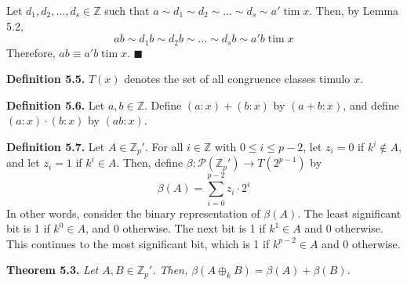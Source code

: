 \documentclass{article}
\newcommand{\tim}{\;\text{tim}\;}
\newcommand{\zee}{\mathbb{Z}}
\begin{document}
Let $d_1, d_2, \ldots, d_s \in \zee$
such that $a \sim d_1 \sim d_2 \sim \ldots \sim d_s \sim a' \tim x$.
Then, by Lemma 5.2,
\[ab \sim d_1b \sim d_2b \sim \ldots
\sim d_sb \sim a'b \tim x\]
Therefore, $ab \equiv a'b \tim x$.
$\blacksquare$

\textbf{Definition 5.5.} $T(x)$ denotes the set of all
congruence classes timulo $x$.

\textbf{Definition 5.6.} Let $a, b \in \zee$. Define
$(a:x) + (b:x)$ by $(a+b:x)$, and define $(a:x) \cdot (b:x)$
by $(ab:x)$.

\textbf{Definition 5.7.} Let $A \in \zee_p'$. For all $i \in \zee$
with $0 \leq i \leq p - 2$, let $z_i = 0$ if $k^i \not\in A$,
and let $z_i = 1$ if $k^i \in A$. Then, define
$\beta: \mathcal{P}(\zee_p') \rightarrow T(2^{p-1})$ by
\[\beta(A) = \sum_{i = 0}^{p-2} z_i \cdot 2^{i}\]
In other words, consider the binary representation of $\beta(A)$.
The least significant bit is 1 if $k^0 \in A$, and 0 otherwise.
The next bit is 1 if $k^1 \in A$ and 0 otherwise.
This continues to the most significant bit,
which is 1 if $k^{p-2} \in A$ and 0 otherwise.

\textbf{Theorem 5.3.} \textit{Let $A, B \in \zee_p'$.
Then, $\beta(A \oplus_k B) = \beta(A) + \beta(B)$.}
\end{document}
